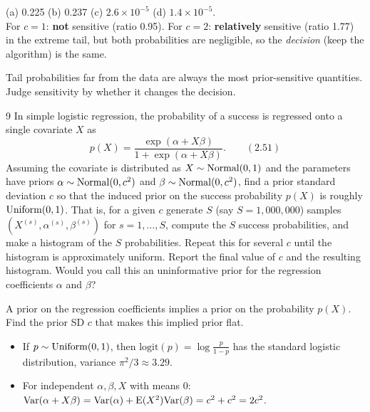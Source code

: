 \documentclass[11pt]{article}
\begin{document}
\begin{answer}
(a) 0.225 \quad (b) 0.237 \quad (c) $2.6\times10^{-5}$ \quad (d) $1.4\times10^{-5}$.\\
For $c=1$: \textbf{not} sensitive (ratio 0.95). For $c=2$: \textbf{relatively} sensitive (ratio 1.77) in the extreme tail, but both probabilities are negligible, so the \emph{decision} (keep the algorithm) is the same.
\end{answer}

\begin{takeaway}
Tail probabilities far from the data are always the most prior-sensitive quantities. Judge sensitivity by whether it changes the decision.
\end{takeaway}


\begin{problem}{9}
In simple logistic regression, the probability of a success is regressed onto a single covariate $X$ as
\[
p(X)=\frac{\exp(\alpha+X\beta)}{1+\exp(\alpha+X\beta)}.\qquad(2.51)
\]
Assuming the covariate is distributed as $X\sim\mathrm{Normal}(0,1)$ and the parameters have priors $\alpha\sim\mathrm{Normal}(0,c^2)$ and $\beta\sim\mathrm{Normal}(0,c^2)$, find a prior standard deviation $c$ so that the induced prior on the success probability $p(X)$ is roughly $\mathrm{Uniform}(0,1)$. That is, for a given $c$ generate $S$ (say $S=1{,}000{,}000$) samples $(X^{(s)},\alpha^{(s)},\beta^{(s)})$ for $s=1,\dots,S$, compute the $S$ success probabilities, and make a histogram of the $S$ probabilities. Repeat this for several $c$ until the histogram is approximately uniform. Report the final value of $c$ and the resulting histogram. Would you call this an uninformative prior for the regression coefficients $\alpha$ and $\beta$?
\end{problem}

\begin{restate}
A prior on the regression coefficients implies a prior on the probability $p(X)$. Find the prior SD $c$ that makes this implied prior flat.
\end{restate}

\begin{recall}
\begin{itemize}
\item If $p\sim\mathrm{Uniform}(0,1)$, then $\mathrm{logit}(p)=\log\frac{p}{1-p}$ has the standard logistic distribution, variance $\pi^2/3\approx3.29$.
\item For independent $\alpha,\beta,X$ with means 0: $\mathrm{Var}(\alpha+X\beta)=\mathrm{Var}(\alpha)+\mathrm{E}(X^2)\mathrm{Var}(\beta)=c^2+c^2=2c^2$.
\end{itemize}
\end{recall}
\end{document}
